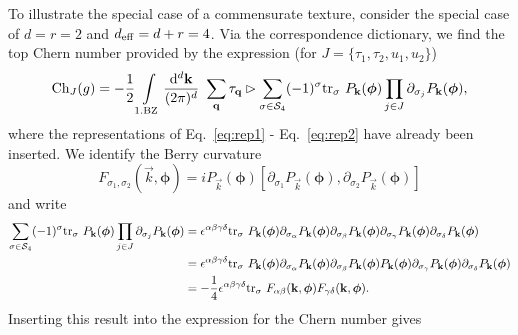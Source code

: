 \documentclass[
    aps,
    prb,
    twocolumn,
    floatfix,
    superscriptaddress,
	10pt
]{revtex4-2}
\begin{document}
To illustrate the special case of a commensurate texture, consider the special case of $d=r=2$ and ${d_\mathrm{eff}} =d+r=4$.
Via the correspondence dictionary, we find the top Chern number provided by the expression (for $J=\lbrace \tau_1, \tau_2, u_1, u_2 \rbrace $)
\begin{align}
{\rm Ch}_{J}(g)
= -\frac{1}{2}
\int\limits_{\mathrm{1.BZ}} \frac{\mathrm{d}^d \mathbf{k}}{(2\pi)^d}~\sum_{\mathbf{q}}\tau_{\mathbf{q}} \rhd\sum_{\sigma \in {\mathcal S}_{4}} (-1)^\sigma \mathrm{tr}_\sigma ~ 
P_{\mathbf{k}}(\boldsymbol{\phi}) \prod_{j \in J} \partial_{\sigma_j}P_{\mathbf{k}}(\boldsymbol{\phi}),
\end{align}
where the representations of Eq.~\ref{eq:rep1} - Eq.~\ref{eq:rep2} have already been inserted.
We identify the Berry curvature 
\begin{equation}
	F_{\sigma_1, \sigma_2}(\vec{k}, \boldsymbol{\phi})
	= i P_{\vec{k}}(\boldsymbol{\phi}) [
	\partial_{\sigma_1} P_{\vec{k}}(\boldsymbol{\phi}), \partial_{\sigma_2} 
	P_{\vec{k}}(\boldsymbol{\phi}) ]
\end{equation}
and write
\begin{align}
\sum_{\sigma \in {\mathcal S}_{4}} (-1)^\sigma \mathrm{tr}_\sigma ~ 
P_{\mathbf{k}}(\boldsymbol{\phi}) \prod_{j \in J} \partial_{\sigma_j}P_{\mathbf{k}}(\boldsymbol{\phi}) &=
\epsilon^{\alpha\beta\gamma\delta}
\mathrm{tr}_\sigma ~
P_{\mathbf{k}}(\boldsymbol{\phi}) \partial_{\sigma_\alpha }P_{\mathbf{k}}(\boldsymbol{\phi})
\partial_{\sigma_\beta }P_{\mathbf{k}}(\boldsymbol{\phi})
\partial_{\sigma_\gamma }P_{\mathbf{k}}(\boldsymbol{\phi})
\partial_{\sigma_\delta }P_{\mathbf{k}}(\boldsymbol{\phi})
\notag \\
&=
\epsilon^{\alpha\beta\gamma\delta}
\mathrm{tr}_\sigma ~
P_{\mathbf{k}}(\boldsymbol{\phi}) \partial_{\sigma_\alpha }P_{\mathbf{k}}(\boldsymbol{\phi})
\partial_{\sigma_\beta }P_{\mathbf{k}}(\boldsymbol{\phi})
P_{\mathbf{k}}(\boldsymbol{\phi}) 
\partial_{\sigma_\gamma }P_{\mathbf{k}}(\boldsymbol{\phi})
\partial_{\sigma_\delta }P_{\mathbf{k}}(\boldsymbol{\phi})
\notag \\
& = - \frac{1}{4}
\epsilon^{\alpha\beta\gamma\delta}
\mathrm{tr}_\sigma ~F_{\alpha \beta}(\mathbf{k}, \boldsymbol{\phi}) F_{\gamma\delta}(\mathbf{k}, \boldsymbol{\phi}) .
\end{align}
Inserting this result into the expression for the Chern number gives
\end{document}
